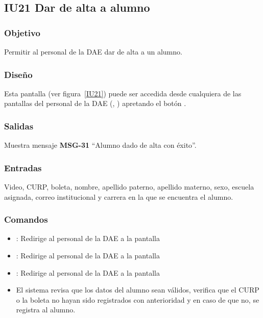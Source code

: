 
\subsection{IU21 Dar de alta a alumno}

\subsubsection{Objetivo}
	Permitir al personal de la DAE dar de alta a un alumno.
\subsubsection{Diseño}
    Esta pantalla  (ver figura~\ref{IU21}) puede ser accedida desde cualquiera de las pantallas del personal de la DAE (, ) apretando el botón .


\subsubsection{Salidas}
Muestra mensaje {\bf MSG-31} ``Alumno dado de alta con éxito''.
\subsubsection{Entradas}
    Video, CURP, boleta, nombre, apellido paterno, apellido materno, sexo, escuela asignada, correo institucional y carrera en la que se encuentra el alumno.
\subsubsection{Comandos}
\begin{itemize}
	\item {}: Redirige al personal de la DAE a la pantalla 
	\item {}: Redirige al personal de la DAE a la pantalla 
	\item {}: Redirige al personal de la DAE a la pantalla 
	
    \item {}  El sistema revisa que los datos del alumno sean válidos, verifica que el CURP o la boleta no hayan sido registrados con anterioridad y en caso de que no, se registra al alumno.
    
\end{itemize}

